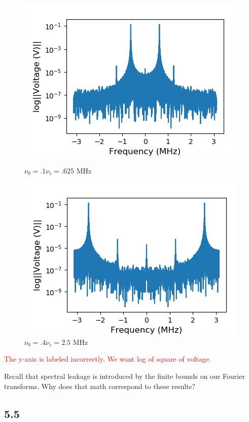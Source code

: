 \documentclass[a4paper]{article}
\begin{document}
\begin{figure}
\centering
\begin{minipage}{.5\textwidth}
	\centering
	\includegraphics[width=.8\linewidth]{5-4/t1_quarter}
	\caption{$\nu_0 = .1 \nu_s = .625$ MHz}
	\label{fig:tenth_leakage}
\end{minipage}%
\begin{minipage}{.5\textwidth}
	\centering
	\includegraphics[width=.8\linewidth]{5-4/t4_quarter}
	\caption{$\nu_0 = .4 \nu_s = 2.5$ MHz}
	\label{fig:4tenths_leakage}
\end{minipage}
\end{figure}

\textcolor{red}{The y-axis is labeled incorrectly. We want log of square of voltage.}

Recall that spectral leakage is introduced by the finite bounds on our Fourier transforms. Why does that math correspond to these results?

\subsection{5.5}
\end{document}

